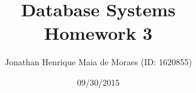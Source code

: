 \title{Database Systems \\ Homework 3}
\author{Jonathan Henrique Maia de Moraes (ID: 1620855)}
\date{09/30/2015}
\maketitle